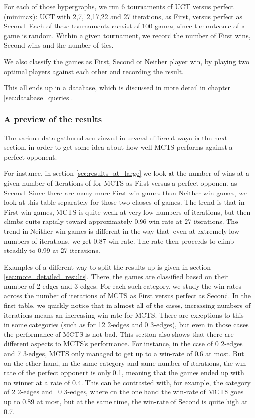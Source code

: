 For each of those hypergraphs, we run 6 tournaments of UCT versus perfect (minimax): UCT with 2,7,12,17,22 and 27 iterations, as First, versus perfect as Second.
Each of these tournaments consist of 100 games, since the outcome of a game is random. Within a given tournament, we record the number of First wins, Second wins and the number of ties.

We also classify the games as First, Second or Neither player win, by playing two optimal players against each other and recording the result.

This all ends up in a database, which is discussed in more detail in chapter \ref{sec:database_queries}.

\subsubsection{A preview of the results}

The various data gathered are viewed in several different ways in the next section, in order to get some idea about how well MCTS performs against a perfect opponent.

For instance, in section \ref{sec:results_at_large} we look at the number of wins at a given number of iterations of for MCTS as First versus a perfect opponent as Second. Since there are many more First-win games than Neither-win games, we look at this table separately for those two classes of games. The trend is that in First-win games, MCTS is quite weak at very low numbers of iterations, but then climbs quite rapidly toward approximately 0.96 win rate at 27 iterations. The trend in Neither-win games is different in the way that, even at extremely low numbers of iterations, we get 0.87 win rate. The rate then proceeds to climb steadily to 0.99 at 27 iterations.

Examples of a different way to split the results up is given in section \ref{sec:more_detailed_results}.
There, the games are classified based on their number of 2-edges and 3-edges. For each such category, we study the win-rates across the number of iterations of MCTS as First versus perfect as Second.
In the first table, we quickly notice that in almost all of the cases, increasing numbers of iterations means an increasing win-rate for MCTS. There are exceptions to this in some categories (such as for 12 2-edges and 0 3-edges), but even in those cases the performance of MCTS is not bad.
This section also shows that there are different aspects to MCTS's performance. For instance, in the case of 0 2-edges and 7 3-edges, MCTS only managed to get up to a win-rate of 0.6 at most. But on the other hand, in the same category and same number of iterations, the win-rate of the perfect opponent is only 0.1, meaning that the games ended up with no winner at a rate of 0.4. This can be contrasted with, for example, the category of 2 2-edges and 10 3-edges, where on the one hand the win-rate of MCTS goes up to 0.89 at most, but at the same time, the win-rate of Second is quite high at 0.7.
